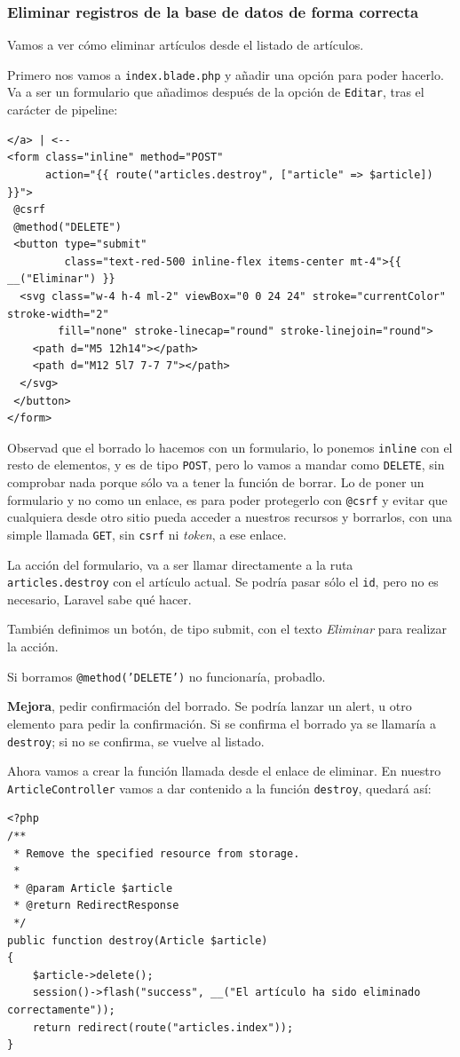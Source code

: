 \documentclass[11pt]{article}
\begin{document}
\subsubsection{Eliminar registros de la base de datos de forma correcta}
\label{sec:org3ffc57d}
Vamos a ver cómo eliminar artículos desde el listado de artículos.

Primero nos vamos a \texttt{index.blade.php} y añadir una opción para poder
hacerlo. Va a ser un formulario que añadimos después de la opción de
\texttt{Editar}, tras el carácter de pipeline:
\begin{verbatim}
</a> | <--
<form class="inline" method="POST"
      action="{{ route("articles.destroy", ["article" => $article]) }}">
 @csrf
 @method("DELETE")
 <button type="submit"
         class="text-red-500 inline-flex items-center mt-4">{{ __("Eliminar") }}
  <svg class="w-4 h-4 ml-2" viewBox="0 0 24 24" stroke="currentColor" stroke-width="2"
        fill="none" stroke-linecap="round" stroke-linejoin="round">
    <path d="M5 12h14"></path>
    <path d="M12 5l7 7-7 7"></path>
  </svg>
 </button>
</form>
\end{verbatim}

Observad que el borrado lo hacemos con un formulario, lo ponemos
\texttt{inline} con el resto de elementos, y es de tipo \texttt{POST}, pero lo vamos
a mandar como \texttt{DELETE}, sin comprobar nada porque sólo va a tener la
función de borrar. Lo de poner un formulario y no como un enlace, es
para poder protegerlo con \texttt{@csrf} y evitar que cualquiera desde otro
sitio pueda acceder a nuestros recursos y borrarlos, con una simple
llamada \texttt{GET}, sin \texttt{csrf} ni \emph{token}, a ese enlace.

La acción del formulario, va a ser llamar directamente a la ruta
\texttt{articles.destroy} con el artículo actual. Se podría pasar sólo el
\texttt{id}, pero no es necesario, Laravel sabe qué hacer.

También definimos un botón, de tipo submit, con el texto \emph{Eliminar}
para realizar la acción.

Si borramos \texttt{@method('DELETE')} no funcionaría, probadlo.

\textbf{Mejora}, pedir confirmación del borrado. Se podría lanzar un alert, u
otro elemento para pedir la confirmación. Si se confirma el borrado ya
se llamaría a \texttt{destroy}; si no se confirma, se vuelve al listado.

Ahora vamos a crear la función llamada desde el enlace de eliminar. En
nuestro \texttt{ArticleController} vamos a dar contenido a la función
\texttt{destroy}, quedará así:
\begin{verbatim}
<?php
/**
 * Remove the specified resource from storage.
 *
 * @param Article $article
 * @return RedirectResponse
 */
public function destroy(Article $article)
{
    $article->delete();
    session()->flash("success", __("El artículo ha sido eliminado correctamente"));
    return redirect(route("articles.index"));
}
\end{verbatim}
\end{document}
